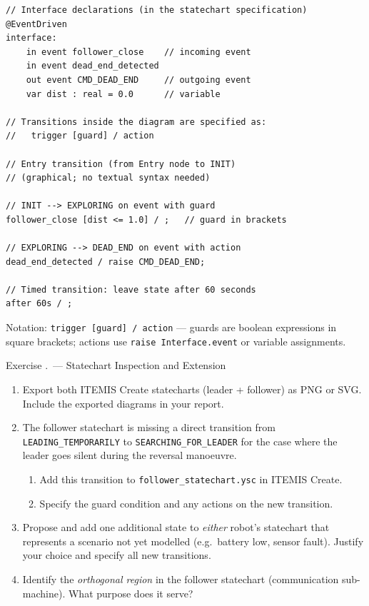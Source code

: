 \documentclass[11pt, a4paper]{article}
\newcounter{exercise}[section]
\renewcommand{\theexercise}{\thesection.\arabic{exercise}}
\newenvironment{Ex}[1]
  {\refstepcounter{exercise}\begin{taskbox}{Exercise \theexercise\ --- #1}}
  {\end{taskbox}}
\begin{document}
\begin{lstlisting}[style=xmlcode, caption={ITEMIS Create Statechart Language (SCL) syntax (excerpt).}]
// Interface declarations (in the statechart specification)
@EventDriven
interface:
    in event follower_close    // incoming event
    in event dead_end_detected
    out event CMD_DEAD_END     // outgoing event
    var dist : real = 0.0      // variable

// Transitions inside the diagram are specified as:
//   trigger [guard] / action

// Entry transition (from Entry node to INIT)
// (graphical; no textual syntax needed)

// INIT --> EXPLORING on event with guard
follower_close [dist <= 1.0] / ;   // guard in brackets

// EXPLORING --> DEAD_END on event with action
dead_end_detected / raise CMD_DEAD_END;

// Timed transition: leave state after 60 seconds
after 60s / ;
\end{lstlisting}

Notation: \texttt{trigger [guard] / action} — guards are boolean expressions
in square brackets; actions use \texttt{raise Interface.event} or variable assignments.

\begin{Ex}{Statechart Inspection and Extension}
\begin{enumerate}
  \item Export both ITEMIS Create statecharts (leader + follower) as PNG or SVG.
        Include the exported diagrams in your report.
  \item The follower statechart is missing a direct transition from
        \texttt{LEADING\_TEMPORARILY} to \texttt{SEARCHING\_FOR\_LEADER}
        for the case where the leader goes silent during the reversal manoeuvre.
        \begin{enumerate}[label=\alph*)]
          \item Add this transition to \texttt{follower\_statechart.ysc} in ITEMIS Create.
          \item Specify the guard condition and any actions on the new transition.
        \end{enumerate}
  \item Propose and add one additional state to \emph{either} robot's statechart
        that represents a scenario not yet modelled (e.g.\ battery low, sensor fault).
        Justify your choice and specify all new transitions.
  \item Identify the \emph{orthogonal region} in the follower statechart
        (communication sub-machine). What purpose does it serve?
\end{enumerate}
\end{Ex}
\end{document}
